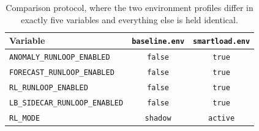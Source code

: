 \begin{table}[H]
  \centering
  \caption[Comparison protocol: same stack, only flags differ]{Comparison protocol, where the two environment profiles differ in exactly five variables and everything else is held identical.}
  \label{tab:imc:protocol}
  \small
  \begin{tabular}{@{}l c c@{}}
    \toprule
    \textbf{Variable} & \texttt{baseline.env} & \texttt{smartload.env} \\
    \midrule
    \texttt{ANOMALY\_RUNLOOP\_ENABLED}    & \texttt{false}  & \texttt{true}   \\
    \texttt{FORECAST\_RUNLOOP\_ENABLED}   & \texttt{false}  & \texttt{true}   \\
    \texttt{RL\_RUNLOOP\_ENABLED}         & \texttt{false}  & \texttt{true}   \\
    \texttt{LB\_SIDECAR\_RUNLOOP\_ENABLED}& \texttt{false}  & \texttt{true}   \\
    \texttt{RL\_MODE}                     & \texttt{shadow} & \texttt{active} \\
    \bottomrule
  \end{tabular}
\end{table}

